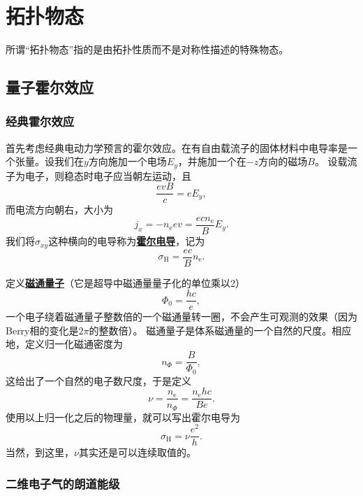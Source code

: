 \documentclass[hyperref, UTF8, a4paper]{ctexart}
\newcommand*{\concept}[1]{\underline{\textbf{#1}}}
\begin{document}
\section{拓扑物态}

所谓“拓扑物态”指的是由拓扑性质而不是对称性描述的特殊物态。

\subsection{量子霍尔效应}

\subsubsection{经典霍尔效应}

首先考虑经典电动力学预言的霍尔效应。在有自由载流子的固体材料中电导率是一个张量。设我们在$y$方向施加一个电场$E_y$，并施加一个在$-z$方向的磁场$B$。
设载流子为电子，则稳态时电子应当朝左运动，且
\[
    \frac{e v B}{c} = e E_y,
\]
而电流方向朝右，大小为
\[
    j_x = - n_\text{e} e v = \frac{e c n_\text{e}}{B} E_y.
\]
我们将$\sigma_{xy}$这种横向的电导称为\concept{霍尔电导}，记为
\begin{equation}
    \sigma_\text{H} = \frac{ec}{B} n_\text{e}.
\end{equation}

定义\concept{磁通量子}（它是超导中磁通量量子化的单位乘以2）
\begin{equation}
    \Phi_0 = \frac{h c}{e},
\end{equation}
一个电子绕着磁通量子整数倍的一个磁通量转一圈，不会产生可观测的效果（因为Berry相的变化是$2\pi$的整数倍）。
磁通量子是体系磁通量的一个自然的尺度。相应地，定义归一化磁通密度为
\begin{equation}
    n_{\Phi} = \frac{B}{\Phi_0},
\end{equation}
这给出了一个自然的电子数尺度，于是定义
\begin{equation}
    \nu = \frac{n_\text{e}}{n_\Phi} = \frac{n_\text{e} h c}{B e}.
\end{equation}
使用以上归一化之后的物理量，就可以写出霍尔电导为
\begin{equation}
    \sigma_\text{H} = \nu \frac{e^2}{h}.
\end{equation}
当然，到这里，$\nu$其实还是可以连续取值的。

\subsubsection{二维电子气的朗道能级}
\end{document}
